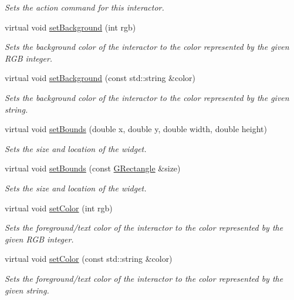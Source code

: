 \begin{DoxyCompactItemize}
\begin{DoxyCompactList}\small\item\em Sets the action command for this interactor. \end{DoxyCompactList}\item 
virtual void \mbox{\hyperlink{classGInteractor_acba7e546c2025c0a15ca4b4cc92043db}{set\+Background}} (int rgb)
\begin{DoxyCompactList}\small\item\em Sets the background color of the interactor to the color represented by the given R\+GB integer. \end{DoxyCompactList}\item 
virtual void \mbox{\hyperlink{classGInteractor_ab4677ab2474e68b07aa56605af92a84a}{set\+Background}} (const std\+::string \&color)
\begin{DoxyCompactList}\small\item\em Sets the background color of the interactor to the color represented by the given string. \end{DoxyCompactList}\item 
virtual void \mbox{\hyperlink{classGInteractor_a2aae8197624b72265ab83b4f1bc73f2f}{set\+Bounds}} (double x, double y, double width, double height)
\begin{DoxyCompactList}\small\item\em Sets the size and location of the widget. \end{DoxyCompactList}\item 
virtual void \mbox{\hyperlink{classGInteractor_acada386653f008cacc7cce86426bef7c}{set\+Bounds}} (const \mbox{\hyperlink{classGRectangle}{G\+Rectangle}} \&size)
\begin{DoxyCompactList}\small\item\em Sets the size and location of the widget. \end{DoxyCompactList}\item 
virtual void \mbox{\hyperlink{classGInteractor_ab1f5cc0f5cc6bbbd716a526c61f1081d}{set\+Color}} (int rgb)
\begin{DoxyCompactList}\small\item\em Sets the foreground/text color of the interactor to the color represented by the given R\+GB integer. \end{DoxyCompactList}\item 
virtual void \mbox{\hyperlink{classGInteractor_a61374df6c11b52cfbb0815decdbaebc6}{set\+Color}} (const std\+::string \&color)
\begin{DoxyCompactList}\small\item\em Sets the foreground/text color of the interactor to the color represented by the given string. \end{DoxyCompactList}\item 

\end{DoxyCompactItemize}
